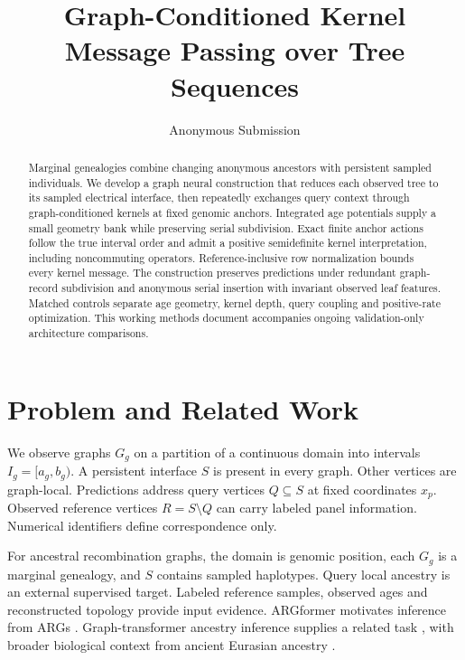 \documentclass[letterpaper]{article}
\title{Graph-Conditioned Kernel Message Passing over Tree Sequences}
\author{Anonymous Submission}
\begin{document}
\maketitle
\begin{abstract}
Marginal genealogies combine changing anonymous ancestors with persistent sampled individuals. We develop a graph neural construction that reduces each observed tree to its sampled electrical interface, then repeatedly exchanges query context through graph-conditioned kernels at fixed genomic anchors. Integrated age potentials supply a small geometry bank while preserving serial subdivision. Exact finite anchor actions follow the true interval order and admit a positive semidefinite kernel interpretation, including noncommuting operators. Reference-inclusive row normalization bounds every kernel message. The construction preserves predictions under redundant graph-record subdivision and anonymous serial insertion with invariant observed leaf features. Matched controls separate age geometry, kernel depth, query coupling and positive-rate optimization. This working methods document accompanies ongoing validation-only architecture comparisons.
\end{abstract}

\section{Problem and Related Work}
We observe graphs $G_g$ on a partition of a continuous domain into intervals $I_g=[a_g,b_g)$. A persistent interface $S$ is present in every graph. Other vertices are graph-local. Predictions address query vertices $Q\subseteq S$ at fixed coordinates $x_p$. Observed reference vertices $R=S\setminus Q$ can carry labeled panel information. Numerical identifiers define correspondence only.

For ancestral recombination graphs, the domain is genomic position, each $G_g$ is a marginal genealogy, and $S$ contains sampled haplotypes. Query local ancestry is an external supervised target. Labeled reference samples, observed ages and reconstructed topology provide input evidence. ARGformer motivates inference from ARGs \citep{argformer2026}. Graph-transformer ancestry inference supplies a related task \citep{ancientancestry2026}, with broader biological context from ancient Eurasian ancestry \citep{eurasians2024}.
\end{document}

